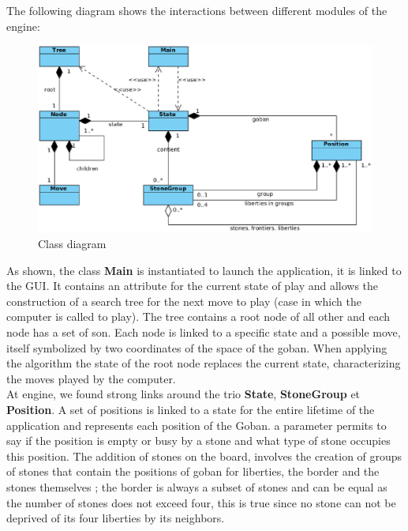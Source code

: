 \documentclass[a4paper,10pt,twoside]{report}
\begin{document}
	The following diagram shows the interactions between different modules of the engine:
	\begin{figure}[htb!]
	\includegraphics[width=17.5cm]{diagram_class}

	\caption{Class diagram}
	\label{fig:class}
	\end{figure}

As shown, the class \textbf{Main} is instantiated to launch the application, it is linked to the GUI. It contains an attribute for the current state of play and allows the construction of a search tree for the next move to play (case in which the computer is called to play). The tree contains a root node of all other and each node has a set of son. Each node is linked to a specific state and a possible move, itself symbolized by two coordinates of the space of the goban. When applying the algorithm the state of the root node replaces the current state, characterizing the moves played by the computer.\\

	At engine, we found strong links around the trio \textbf{State}, \textbf{StoneGroup} et \textbf{Position}. A set of positions is linked to a state for the entire lifetime of the application and represents each position of the Goban. a parameter permits to say if the position is empty or busy by a stone and what type of stone occupies this position. The addition of stones on the board, involves the creation of groups of stones that contain the positions of goban for liberties, the border and the stones themselves ; the border is always a subset of stones and can be equal as the number of stones does not exceed four, this is true since no stone can not be deprived of its four liberties by its neighbors.\\
\end{document}
